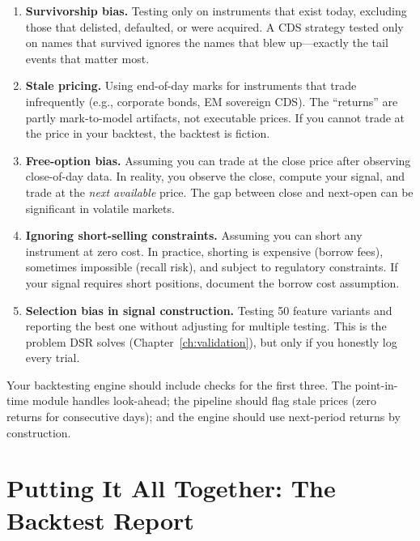 \begin{enumerate}[leftmargin=2em]
\item \textbf{Survivorship bias.}  Testing only on instruments that exist today, excluding those that delisted, defaulted, or were acquired.  A CDS strategy tested only on names that survived ignores the names that blew up---exactly the tail events that matter most.

\item \textbf{Stale pricing.}  Using end-of-day marks for instruments that trade infrequently (e.g., corporate bonds, EM sovereign CDS).  The ``returns'' are partly mark-to-model artifacts, not executable prices.  If you cannot trade at the price in your backtest, the backtest is fiction.

\item \textbf{Free-option bias.}  Assuming you can trade at the close price after observing close-of-day data.  In reality, you observe the close, compute your signal, and trade at the \emph{next available} price.  The gap between close and next-open can be significant in volatile markets.

\item \textbf{Ignoring short-selling constraints.}  Assuming you can short any instrument at zero cost.  In practice, shorting is expensive (borrow fees), sometimes impossible (recall risk), and subject to regulatory constraints.  If your signal requires short positions, document the borrow cost assumption.

\item \textbf{Selection bias in signal construction.}  Testing 50 feature variants and reporting the best one without adjusting for multiple testing.  This is the problem DSR solves (Chapter~\ref{ch:validation}), but only if you honestly log every trial.
\end{enumerate}

Your backtesting engine should include checks for the first three.  The point-in-time module handles look-ahead; the pipeline should flag stale prices (zero returns for consecutive days); and the engine should use next-period returns by construction.

\section{Putting It All Together: The Backtest Report}
\label{sec:backtest-report}

